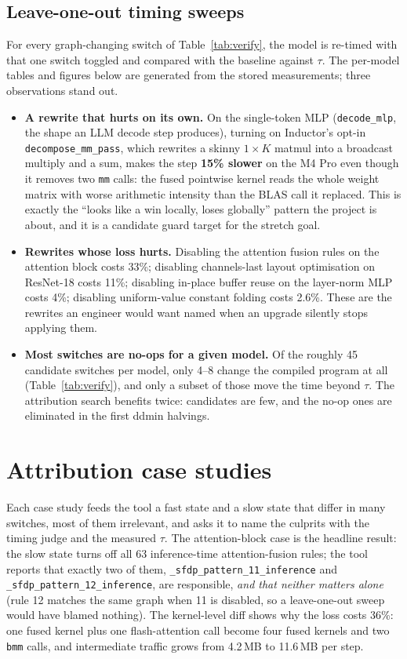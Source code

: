 \documentclass[11pt]{article}
\newcommand{\code}[1]{\texttt{#1}}
\begin{document}
\subsection{Leave-one-out timing sweeps}
For every graph-changing switch of Table~\ref{tab:verify}, the model is re-timed with that one
switch toggled and compared with the baseline against $\tau$. The per-model tables and figures
below are generated from the stored measurements; three observations stand out.
\begin{itemize}
\item \textbf{A rewrite that hurts on its own.} On the single-token MLP (\code{decode\_mlp}, the
  shape an LLM decode step produces), turning on Inductor's opt-in \code{decompose\_mm\_pass}, which
  rewrites a skinny $1\times K$ matmul into a broadcast multiply and a sum, makes the step
  \textbf{15\% slower} on the M4 Pro even though it removes two \code{mm} calls: the fused
  pointwise kernel reads the whole weight matrix with worse arithmetic intensity than the BLAS
  call it replaced. This is exactly the ``looks like a win locally, loses globally'' pattern the
  project is about, and it is a candidate guard target for the stretch goal.
\item \textbf{Rewrites whose loss hurts.} Disabling the attention fusion rules on the attention
  block costs 33\%; disabling channels-last layout optimisation on ResNet-18 costs 11\%;
  disabling in-place buffer reuse on the layer-norm MLP costs 4\%; disabling uniform-value constant
  folding costs 2.6\%. These are the rewrites an engineer would want named when an upgrade
  silently stops applying them.
\item \textbf{Most switches are no-ops for a given model.} Of the roughly 45 candidate switches per
  model, only 4--8 change the compiled program at all (Table~\ref{tab:verify}), and only a subset
  of those move the time beyond $\tau$. The attribution search benefits twice: candidates are few,
  and the no-op ones are eliminated in the first ddmin halvings.
\end{itemize}
%

\FloatBarrier
\section{Attribution case studies}\label{sec:attr}
Each case study feeds the tool a fast state and a slow state that differ in many switches, most
of them irrelevant, and asks it to name the culprits with the timing judge and the measured
$\tau$. The attention-block case is the headline result: the slow state turns off all 63
inference-time attention-fusion rules; the tool reports that exactly two of them,
\code{\_sfdp\_pattern\_11\_inference} and \code{\_sfdp\_pattern\_12\_inference}, are responsible,
\emph{and that neither matters alone} (rule 12 matches the same graph when 11 is disabled, so a
leave-one-out sweep would have blamed nothing). The kernel-level diff shows why the loss costs
36\%: one fused kernel plus one flash-attention call become four fused kernels and two
\code{bmm} calls, and intermediate traffic grows from 4.2\,MB to 11.6\,MB per step.
%
\end{document}

